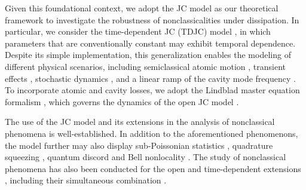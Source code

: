 \documentclass[aps,pre,superscriptaddress,twocolumn,10pt]{revtex4-2}
\begin{document}
Given this foundational context, we adopt the JC model as our theoretical framework to investigate the robustness of nonclassicalities under dissipation.
In particular, we consider the time-dependent JC (TDJC) model \cite{DeCastro2023,LARSON2021,Tsutsui2026}, in which parameters that are conventionally constant may exhibit temporal dependence.
Despite its simple implementation, this generalization enables the modeling of different physical scenarios, including semiclassical atomic motion \cite{Schlicher1989,Fang1998}, transient effects \cite{Dasgupta1999,Prants1992}, 
stochastic dynamics \cite{Joshi1995}, and a linear ramp of the cavity mode frequency \cite{Joshi1993}. 
To incorporate atomic and cavity losses, we adopt the Lindblad master equation formalism \cite{Lindblad1976,Manzano2020}, which governs the dynamics of the open JC model \cite{Barnett1986,Puri1988}.

The use of the JC model and its extensions in the analysis of nonclassical phenomena is well-established. 
In addition to the aforementioned phenomenons, the model further may also display sub-Poissonian statistics \cite{Hillery1987,Chumakov1993}, quadrature squeezing \cite{Kuklinski1988,Hillery1989}, quantum discord \cite{Mirmasoudi2018} and Bell nonlocality \cite{Bernal2025}.
The study of nonclassical phenomena has also been conducted for the open \cite{Clemens2000,Rendell2003,Smirne2010,Mohamed2019,Mohamed2025} and time-dependent extensions \cite{Fang1998,Joshi1993,Chao2010,Hu2014,Abdel-Khalek2016a}, including their simultaneous combination \cite{Abdel-Khalek2016a,Kolar2024}. 
\end{document}
